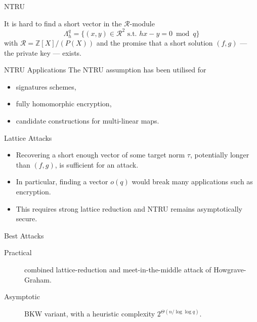 \documentclass[presentation,smaller]{beamer}
\newcommand{\cR}{\ensuremath{\mathcal{R}}\xspace}
\newcommand{\Z}{\ensuremath{\mathbb Z}\xspace}
\begin{document}
\begin{frame}[label={sec:orgb484b3d}]{NTRU}
\begin{definition}
It is hard to find a short vector in the \cR-module \[\Lambda_h^q = \{(x,y) \in \cR^2 \text{ s.t. } hx - y = 0 \bmod q\}\]
with \(\cR = \Z[X]/(P(X))\) and the promise that a short solution \((f,g)\) — the private key — exists. 
\end{definition}
\end{frame}

\begin{frame}[label={sec:org4514f33}]{NTRU Applications}
The NTRU assumption has been utilised for

\begin{itemize}
\item signatures schemes, 
\item fully homomorphic encryption,
\item candidate constructions for multi-linear maps.
\end{itemize}
\end{frame}

\begin{frame}[label={sec:org77a0fd8}]{Lattice Attacks}
\begin{itemize}
\item Recovering a short enough vector of some target norm \(τ\), potentially longer than \((f,g)\), is sufficient for an attack.

\item In particular, finding a vector \(o(q)\) would break many applications such as encryption.

\item This requires strong lattice reduction and NTRU remains asymptotically secure. 
\end{itemize}
\end{frame}

\begin{frame}[label={sec:orgaffb704}]{Best Attacks}
\begin{description}
\item[{Practical}] combined lattice-reduction and meet-in-the-middle attack  of Howgrave-Graham.  

\item[{Asymptotic}] BKW variant, with a heuristic complexity \(2^{\Theta(n/\log \log q)}\).
\end{description}
\end{frame}
\end{document}
